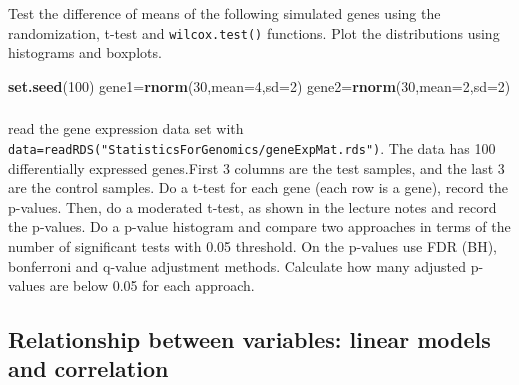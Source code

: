 \documentclass[12pt,]{krantz}
\newenvironment{Shaded}{\begin{snugshade}}{\end{snugshade}}
\newcommand{\DataTypeTok}[1]{\textcolor[rgb]{0.13,0.29,0.53}{#1}}
\newcommand{\DecValTok}[1]{\textcolor[rgb]{0.00,0.00,0.81}{#1}}
\newcommand{\KeywordTok}[1]{\textcolor[rgb]{0.13,0.29,0.53}{\textbf{#1}}}
\newcommand{\NormalTok}[1]{#1}
\theoremstyle{definition}
\theoremstyle{definition}
\theoremstyle{definition}
\theoremstyle{remark}
\begin{document}
\hypertarget{section-5}{%
\subsubsection{}\label{section-5}}

Test the difference of means of the following simulated genes using the
randomization, t-test and \texttt{wilcox.test()} functions. Plot the
distributions using histograms and boxplots.

\begin{Shaded}
\begin{Highlighting}[]
\KeywordTok{set.seed}\NormalTok{(}\DecValTok{100}\NormalTok{)}
\NormalTok{gene1=}\KeywordTok{rnorm}\NormalTok{(}\DecValTok{30}\NormalTok{,}\DataTypeTok{mean=}\DecValTok{4}\NormalTok{,}\DataTypeTok{sd=}\DecValTok{2}\NormalTok{)}
\NormalTok{gene2=}\KeywordTok{rnorm}\NormalTok{(}\DecValTok{30}\NormalTok{,}\DataTypeTok{mean=}\DecValTok{2}\NormalTok{,}\DataTypeTok{sd=}\DecValTok{2}\NormalTok{)}
\end{Highlighting}
\end{Shaded}

\hypertarget{section-6}{%
\subsubsection{}\label{section-6}}

read the gene expression data set with
\texttt{data=readRDS("StatisticsForGenomics/geneExpMat.rds")}. The data
has 100 differentially expressed genes.First 3 columns are the test
samples, and the last 3 are the control samples. Do a t-test for each
gene (each row is a gene), record the p-values. Then, do a moderated
t-test, as shown in the lecture notes and record the p-values. Do a
p-value histogram and compare two approaches in terms of the number of
significant tests with 0.05 threshold. On the p-values use FDR (BH),
bonferroni and q-value adjustment methods. Calculate how many adjusted
p-values are below 0.05 for each approach.

\hypertarget{relationship-between-variables-linear-models-and-correlation-1}{%
\subsection{Relationship between variables: linear models and
correlation}\label{relationship-between-variables-linear-models-and-correlation-1}}

\hypertarget{section-7}{%
\subsubsection{}\label{section-7}}
\end{document}
